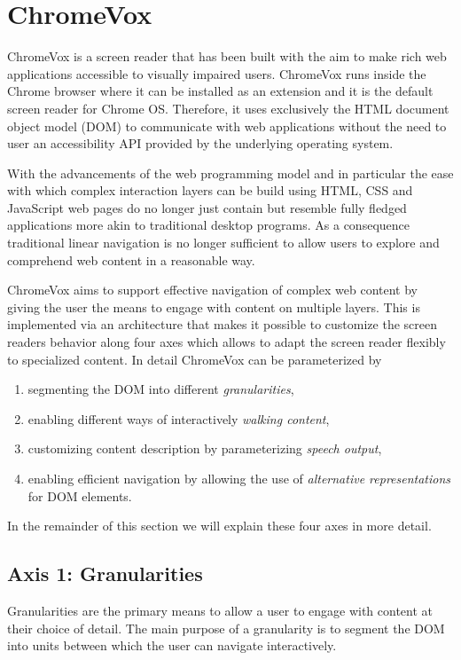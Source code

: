 \documentclass{sig-alternate}
\begin{document}
\section{ChromeVox}
\label{sec:chromevox}

ChromeVox is a screen reader that has been built with the aim to make rich web
applications accessible to visually impaired users. ChromeVox runs inside the
Chrome browser where it can be installed as an extension and it is the default
screen reader for Chrome OS. Therefore, it uses exclusively the HTML document
object model (DOM) to communicate with web applications without the need to user
an accessibility API provided by the underlying operating system.

With the advancements of the web programming model and in particular the ease
with which complex interaction layers can be build using HTML, CSS and
JavaScript web pages do no longer just contain but resemble fully fledged
applications more akin to traditional desktop programs. As a consequence
traditional linear navigation is no longer sufficient to allow users to explore
and comprehend web content in a reasonable way.

ChromeVox aims to support effective navigation of complex web content by giving
the user the means to engage with content on multiple layers. This is
implemented via an architecture that makes it possible to customize the screen
readers behavior along four axes which allows to adapt the screen reader
flexibly to specialized content. In detail ChromeVox can be parameterized by 
\begin{enumerate}[(1)]
\item segmenting the DOM into different \emph{granularities},
\item enabling different ways of interactively \emph{walking content},
\item customizing content description by parameterizing \emph{speech output},
\item enabling efficient navigation by allowing the use of \emph{alternative
    representations} for DOM elements.
\end{enumerate}
In the remainder of this section we will explain these four axes in more detail.


\subsection{Axis 1: Granularities}
\label{sec:ax1}

Granularities are the primary means to allow a user to engage with content at
their choice of detail. The main purpose of a granularity is to segment the DOM
into units between which the user can navigate interactively.
\end{document}
